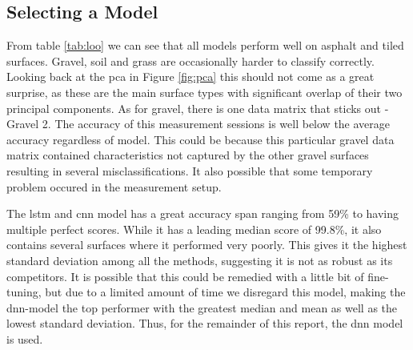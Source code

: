 \subsection{Selecting a Model}


From table \ref{tab:loo} we can see that all models perform well on asphalt and tiled surfaces. Gravel, soil and grass are occasionally harder to classify correctly. Looking back at the \gls{pca} in Figure \ref{fig:pca} this should not come as a great surprise, as these are the main surface types with significant overlap of their two principal components. As for gravel, there is one data matrix that sticks out - Gravel 2. The accuracy of this measurement sessions is well below the average accuracy regardless of model. This could be because this particular gravel data matrix contained characteristics not captured by the other gravel surfaces resulting in several misclassifications. It also possible that some temporary problem occured in the measurement setup.

The \gls{lstm} and \gls{cnn} model has a great accuracy span ranging from 59\% to having multiple perfect scores. While it has a leading median score of 99.8\%, it also contains several surfaces where it performed very poorly. This gives it the highest standard deviation among all the methods, suggesting it is not as robust as its competitors. It is possible that this could be remedied with a little bit of fine-tuning, but due to a limited amount of time we disregard this model, making the \gls{dnn}-model the top performer with the greatest median and mean as well as the lowest standard deviation. Thus, for the remainder of this report, the \gls{dnn} model is used.







